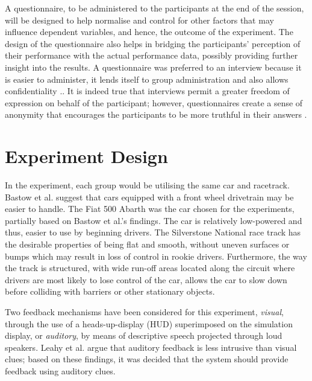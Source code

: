 A questionnaire, to be administered to the participants at the end of the session, will be designed to help normalise and control for other factors that may influence dependent variables, and hence, the outcome of the experiment. The design of the questionnaire also helps in bridging the participants' perception of their performance with the actual performance data, possibly providing further insight into the results. A questionnaire was preferred to an interview because it is easier to administer, it lends itself to group administration and also allows confidentiality \cite{introductiontobehavioralresearchmethods}.. It is indeed true that interviews permit a greater freedom of expression on behalf of the participant; however, questionnaires create a sense of anonymity that encourages the participants to be more truthful in their answers \cite{introductiontobehavioralresearchmethods}.

\section{Experiment Design}
\label{sec:meth-experiment-design}
In the experiment, each group would be utilising the same car and racetrack. Bastow et al. \cite{bastow2004car} suggest that cars equipped with a front wheel drivetrain may be easier to handle. The Fiat 500 Abarth was the car chosen for the experiments, partially based on Bastow et al.'s findings. The car is relatively low-powered and thus, easier to use by beginning drivers. The Silverstone National race track has the desirable properties of being flat and smooth, without uneven surfaces or bumps which may result in loss of control in rookie drivers. Furthermore, the way the track is structured, with wide run-off areas located along the circuit where drivers are most likely to lose control of the car, allows the car to slow down before colliding with barriers or other stationary objects.

Two feedback mechanisms have been considered for this experiment, \emph{visual}, through the use of a heads-up-display (HUD) superimposed on the simulation display, or \emph{auditory}, by means of descriptive speech projected through loud speakers. Leahy et al. \cite{leahy2003auditory} argue that auditory feedback is less intrusive than visual clues; based on these findings, it was decided that the system should provide feedback using auditory clues.

